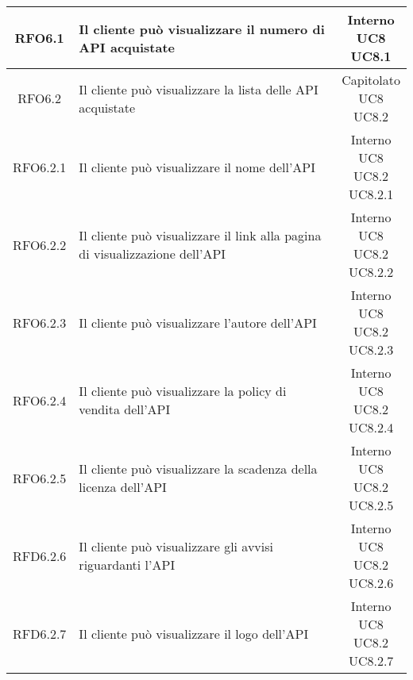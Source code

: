 \begin{longtable}{|c|p{8cm}|c|}
\hypertarget{RFO6.1}{RFO6.1} & Il cliente può visualizzare il numero di API acquistate & \makecell*{Interno\\UC8\\UC8.1} \\
\hline

\hypertarget{RFO6.2}{RFO6.2} & Il cliente può visualizzare la lista delle API acquistate & \makecell*{Capitolato\\UC8\\UC8.2} \\
\hline

\hypertarget{RFO6.2.1}{RFO6.2.1} & Il cliente può visualizzare il nome dell'API & \makecell*{Interno\\UC8\\UC8.2\\UC8.2.1} \\
\hline
\hypertarget{RFO6.2.2}{RFO6.2.2} & Il cliente può visualizzare il link alla pagina di visualizzazione dell'API & \makecell*{Interno\\UC8\\UC8.2\\UC8.2.2} \\
\hline
\hypertarget{RFO6.2.3}{RFO6.2.3} & Il cliente può visualizzare l'autore dell'API & \makecell*{Interno\\UC8\\UC8.2\\UC8.2.3} \\
\hline
\hypertarget{RFO6.2.4}{RFO6.2.4} & Il cliente può visualizzare la policy di vendita dell'API & \makecell*{Interno\\UC8\\UC8.2\\UC8.2.4} \\
\hline
\hypertarget{RFO6.2.5}{RFO6.2.5} & Il cliente può visualizzare la scadenza della licenza dell'API & \makecell*{Interno\\UC8\\UC8.2\\UC8.2.5} \\
\hline
\hypertarget{RFD6.2.6}{RFD6.2.6} & Il cliente può visualizzare gli avvisi riguardanti l'API & \makecell*{Interno\\UC8\\UC8.2\\UC8.2.6} \\
\hline
\hypertarget{RFD6.2.7}{RFD6.2.7} & Il cliente può visualizzare il logo dell'API & \makecell*{Interno\\UC8\\UC8.2\\UC8.2.7} \\
\hline


\end{longtable}
